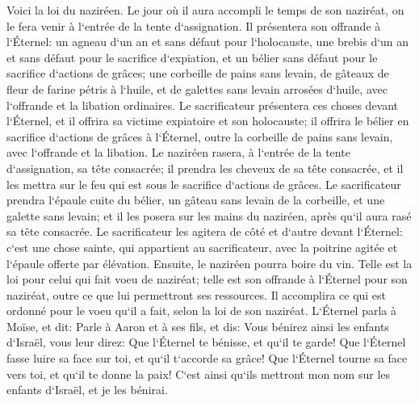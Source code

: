 \verse Voici la loi du naziréen. Le jour où il aura accompli le temps de son naziréat, on le fera venir à l`entrée de la tente d`assignation. 
\verse Il présentera son offrande à l`Éternel: un agneau d`un an et sans défaut pour l`holocauste, une brebis d`un an et sans défaut pour le sacrifice d`expiation, et un bélier sans défaut pour le sacrifice d`actions de grâces; 
\verse une corbeille de pains sans levain, de gâteaux de fleur de farine pétris à l`huile, et de galettes sans levain arrosées d`huile, avec l`offrande et la libation ordinaires. 
\verse Le sacrificateur présentera ces choses devant l`Éternel, et il offrira sa victime expiatoire et son holocauste; 
\verse il offrira le bélier en sacrifice d`actions de grâces à l`Éternel, outre la corbeille de pains sans levain, avec l`offrande et la libation. 
\verse Le naziréen rasera, à l`entrée de la tente d`assignation, sa tête consacrée; il prendra les cheveux de sa tête consacrée, et il les mettra sur le feu qui est sous le sacrifice d`actions de grâces. 
\verse Le sacrificateur prendra l`épaule cuite du bélier, un gâteau sans levain de la corbeille, et une galette sans levain; et il les posera sur les mains du naziréen, après qu`il aura rasé sa tête consacrée. 
\verse Le sacrificateur les agitera de côté et d`autre devant l`Éternel: c`est une chose sainte, qui appartient au sacrificateur, avec la poitrine agitée et l`épaule offerte par élévation. Ensuite, le naziréen pourra boire du vin. 
\verse Telle est la loi pour celui qui fait voeu de naziréat; telle est son offrande à l`Éternel pour son naziréat, outre ce que lui permettront ses ressources. Il accomplira ce qui est ordonné pour le voeu qu`il a fait, selon la loi de son naziréat. 
\verse L`Éternel parla à Moïse, et dit: 
\verse Parle à Aaron et à ses fils, et dis: Vous bénirez ainsi les enfants d`Israël, vous leur direz: 
\verse Que l`Éternel te bénisse, et qu`il te garde! 
\verse Que l`Éternel fasse luire sa face sur toi, et qu`il t`accorde sa grâce! 
\verse Que l`Éternel tourne sa face vers toi, et qu`il te donne la paix! 
\verse C`est ainsi qu`ils mettront mon nom sur les enfants d`Israël, et je les bénirai. 

